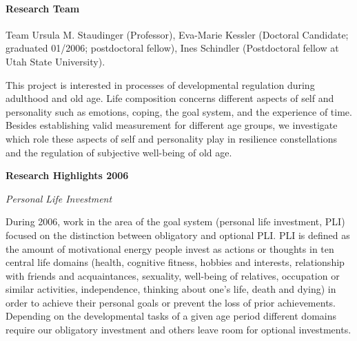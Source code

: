 

\paragraph{Research Team}
Team Ursula M. Staudinger (Professor), Eva-Marie Kessler (Doctoral Candidate; graduated 01/2006; postdoctoral fellow), Ines Schindler (Postdoctoral fellow at Utah State University).

This project is interested in processes of developmental regulation during adulthood and old age. Life composition concerns different aspects of self and personality such as emotions, coping, the goal system, and the experience of time. Besides establishing valid measurement for different age groups, we investigate which role these aspects of self and personality play in resilience constellations and the regulation of subjective well-being of old age. 

\null 
\textbf{Research Highlights 2006}

\textit{Personal Life Investment}

 During 2006, work in the area of the goal system (personal life investment, PLI) focused on the distinction between obligatory and optional PLI. PLI is defined as the amount of motivational energy people invest as actions or thoughts in ten central life domains (health, cognitive fitness, hobbies and interests, relationship with friends and acquaintances, sexuality, well-being of relatives, occupation or similar activities, independence, thinking about one's life, death and dying) in order to achieve their personal goals or prevent the loss of prior achievements. Depending on the developmental tasks of a given age period different domains require our obligatory investment and others leave room for optional investments. 

